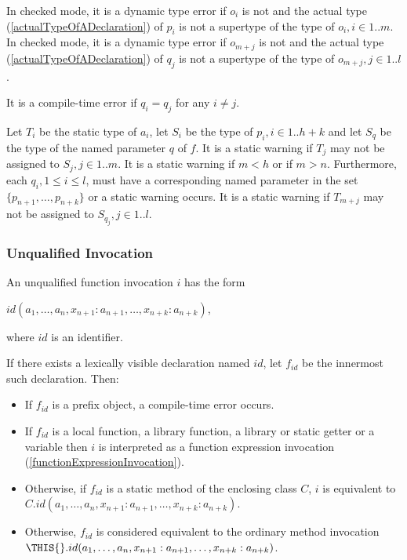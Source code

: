 \documentclass{article}
\begin{document}

\LMHash{}
In checked mode, it is a dynamic type error if  $o_i$ is not \NULL{} and the actual type  (\ref{actualTypeOfADeclaration}) of $p_i$ is not a supertype of the type of $o_i, i \in 1.. m$. In checked mode, it is a dynamic type error if  $o_{m+j}$ is not \NULL{} and the actual type  (\ref{actualTypeOfADeclaration}) of $q_j$ is not a supertype of the type of $o_{m+j}, j \in 1.. l$.

\LMHash{}
It is a compile-time error if $q_i = q_j$ for any $i \ne j$.

\LMHash{}
Let $T_i$ be the static type of $a_i$, let $S_i$ be the type of $p_i, i \in 1 .. h+k$ and let $S_q$ be the type of the named parameter $q$ of $f$.  It is a static warning if $T_j$ may not be assigned to $S_j, j \in 1..m$.  It is a static warning if $m < h$ or if $m > n$. Furthermore, each $q_i, 1 \le i \le l$,  must have a corresponding named parameter in the set $\{p_{n+1}, \ldots, p_{n +k}\}$ or a static warning occurs.  It is a static warning if $T_{m+j}$ may not be assigned to $S_{q_j}, j \in 1 .. l$.

\subsubsection{ Unqualified Invocation}

\LMHash{}
An unqualified function invocation $i$ has the form 

$id(a_1, \ldots, a_n, x_{n+1}: a_{n+1}, \ldots, x_{n+k}: a_{n+k})$, 

where $id$ is an identifier. 

\LMHash{}
If there exists a lexically visible declaration named $id$, let $f_{id}$ be the innermost such declaration. Then:
\begin{itemize}
\item 
If $f_{id}$ is a prefix object, a compile-time error occurs.
\item
 If $f_{id}$ is a local function, a library function, a library or static getter or a variable then $i$ is interpreted as a function expression invocation (\ref{functionExpressionInvocation}).
 \item
Otherwise, if $f_{id}$ is a static method of the enclosing class $C$, $i$ is equivalent to $C.id(a_1, \ldots , a_n, x_{n+1}: a_{n+1}, \ldots , x_{n+k}: a_{n+k})$.
\item Otherwise, $f_{id}$ is considered equivalent to the ordinary method invocation $\THIS{}.id(a_1, \ldots , a_n, x_{n+1}: a_{n+1}, \ldots , x_{n+k}: a_{n+k})$.
\end{itemize}
\end{document}
